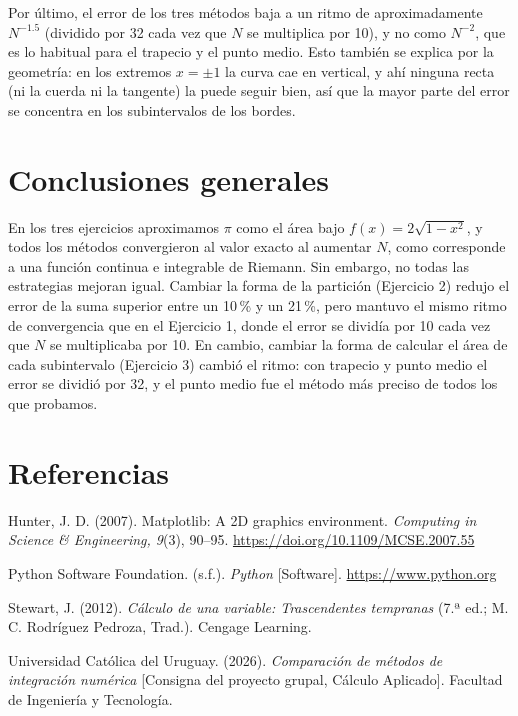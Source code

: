 Por último, el error de los tres métodos baja a un ritmo de aproximadamente \(N^{-1.5}\) (dividido por 32 cada vez que \(N\) se multiplica por 10), y no como \(N^{-2}\), que es lo habitual para el trapecio y el punto medio. Esto también se explica por la geometría: en los extremos \(x=\pm1\) la curva cae en vertical, y ahí ninguna recta (ni la cuerda ni la tangente) la puede seguir bien, así que la mayor parte del error se concentra en los subintervalos de los bordes.

\section{Conclusiones generales}

En los tres ejercicios aproximamos \(\pi\) como el área bajo \(f(x)=2\sqrt{1-x^2}\), y todos los métodos convergieron al valor exacto al aumentar \(N\), como corresponde a una función continua e integrable de Riemann. Sin embargo, no todas las estrategias mejoran igual. Cambiar la forma de la partición (Ejercicio 2) redujo el error de la suma superior entre un 10\,\% y un 21\,\%, pero mantuvo el mismo ritmo de convergencia que en el Ejercicio 1, donde el error se dividía por 10 cada vez que \(N\) se multiplicaba por 10. En cambio, cambiar la forma de calcular el área de cada subintervalo (Ejercicio 3) cambió el ritmo: con trapecio y punto medio el error se dividió por 32, y el punto medio fue el método más preciso de todos los que probamos.

\section*{Referencias}

\begingroup
\setlength{\parindent}{-1.27cm}
\setlength{\leftskip}{1.27cm}
\setlength{\parskip}{6pt}

Hunter, J. D. (2007). Matplotlib: A 2D graphics environment. \textit{Computing in Science \& Engineering, 9}(3), 90--95. \url{https://doi.org/10.1109/MCSE.2007.55}

Python Software Foundation. (s.f.). \textit{Python} [Software]. \url{https://www.python.org}

Stewart, J. (2012). \textit{Cálculo de una variable: Trascendentes tempranas} (7.ª ed.; M. C. Rodríguez Pedroza, Trad.). Cengage Learning.

Universidad Católica del Uruguay. (2026). \textit{Comparación de métodos de integración numérica} [Consigna del proyecto grupal, Cálculo Aplicado]. Facultad de Ingeniería y Tecnología.

\endgroup
